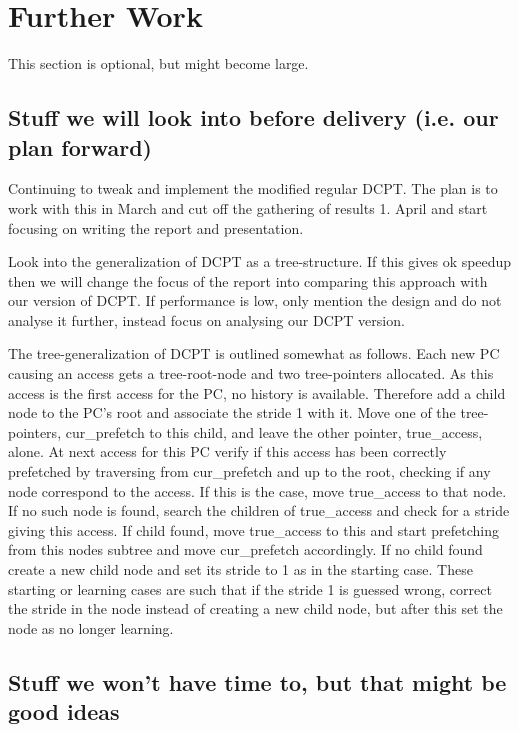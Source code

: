 \chapter{Further Work}
This section is optional, but might become large.

\section{Stuff we will look into before delivery (i.e. our plan forward)}
Continuing to tweak and implement the modified regular DCPT. The plan is
to work with this in March and cut off the gathering of results 1. April
and start focusing on writing the report and presentation.

Look into the generalization of DCPT as a tree-structure. If this gives
ok speedup then we will change the focus of the report into comparing this
approach with our version of DCPT. If performance is low, only mention the
design and do not analyse it further, instead focus on analysing our
DCPT version.

The tree-generalization of DCPT is outlined somewhat as follows. Each new PC
causing an access gets a tree-root-node and two tree-pointers allocated.
As this access is the first access for the PC, no history is available.
Therefore add a child node to the PC's root and associate the stride 1 with it.
Move one of the tree-pointers, cur_prefetch to this child, and leave the other
pointer, true_access, alone. At next access for this PC verify if this access
has been correctly prefetched by traversing from cur_prefetch and up to the
root, checking if any node correspond to the access. If this is the case,
move true_access to that node. If no such node is found, search the children
of true_access and check for a stride giving this access. If child found, move
true_access to this and start prefetching from this nodes subtree and move
cur_prefetch accordingly. If no child found create a new child node and set
its stride to 1 as in the starting case. These starting or learning cases
are such that if the stride 1 is guessed wrong, correct the stride in the node
instead of creating a new child node, but after this set the node as no longer
learning.

\section{Stuff we won't have time to, but that might be good ideas}
